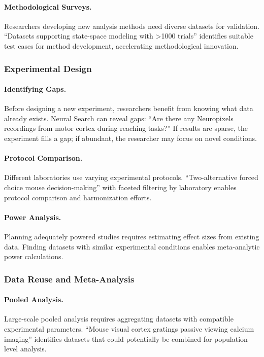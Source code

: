 \documentclass{article}
\theoremstyle{definition}
\begin{document}
\paragraph{Methodological Surveys.} Researchers developing new analysis methods need diverse datasets for validation. ``Datasets supporting state-space modeling with >1000 trials'' identifies suitable test cases for method development, accelerating methodological innovation.

\subsubsection{Experimental Design}

\paragraph{Identifying Gaps.} Before designing a new experiment, researchers benefit from knowing what data already exists. Neural Search can reveal gaps: ``Are there any Neuropixels recordings from motor cortex during reaching tasks?'' If results are sparse, the experiment fills a gap; if abundant, the researcher may focus on novel conditions.

\paragraph{Protocol Comparison.} Different laboratories use varying experimental protocols. ``Two-alternative forced choice mouse decision-making'' with faceted filtering by laboratory enables protocol comparison and harmonization efforts.

\paragraph{Power Analysis.} Planning adequately powered studies requires estimating effect sizes from existing data. Finding datasets with similar experimental conditions enables meta-analytic power calculations.

\subsubsection{Data Reuse and Meta-Analysis}

\paragraph{Pooled Analysis.} Large-scale pooled analysis requires aggregating datasets with compatible experimental parameters. ``Mouse visual cortex gratings passive viewing calcium imaging'' identifies datasets that could potentially be combined for population-level analysis.
\end{document}
